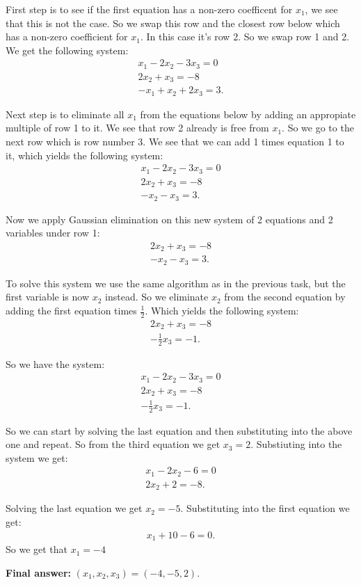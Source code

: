 \documentclass[10pt]{article}
\begin{document}
\begin{solution}[]  \label{sol:}
First step is to see if the first equation has a non-zero coefficent for
\(x_1\), we see that this is not the case. So we swap this row and the closest
row below which has a non-zero coefficient for \(x_1\). In this case it's
row 2. So we swap row 1 and 2. We get the following system:
\begin{align*}
x_1 - 2x_2 - 3x_3 = 0 \\
2x_2 + x_3 = -8 \\
-x_1 + x_2 + 2x_3 = 3
.
\end{align*}

Next step is to eliminate all \(x_1\) from the equations below by adding
an appropiate multiple of row 1 to it. We see that row 2 already is
free from \(x_1\). So we go to the next row which is row number 3. We see
that we can add 1 times equation 1 to it, which yields the following
system:
\begin{align*}
x_1 - 2x_2 - 3x_3 = 0 \\
2x_2 + x_3 = -8 \\
-x_2 - x_3 = 3
.
\end{align*}

Now we apply Gaussian elimination on this new system of 2 equations and
2 variables under row 1:
\begin{align*}
2x_2 + x_3 = -8 \\
-x_2 - x_3 = 3
.
\end{align*}

To solve this system we use the same algorithm as in the previous task, but the
first variable is now \(x_2\) instead. So we eliminate \(x_2\) from the second equation
by adding the first equation times \(\frac{1}{2}\). Which yields the following system:
\begin{align*}
2x_2 + x_3 = -8 \\
- \frac{1}{2} x_3 = -1
.
\end{align*}

So we have the system:
\begin{align*}
x_1 - 2x_2 - 3x_3 = 0 \\
2x_2 + x_3 = -8 \\
-\frac{1}{2}x_3 = -1
.
\end{align*}

So we can start by solving the last equation and then substituting into the above
one and repeat. So from the third equation we get \(x_3 = 2\). Substiuting into the
system we get:
\begin{align*}
x_1 - 2x_2 - 6 = 0 \\
2x_2 + 2 = -8
.
\end{align*}

Solving the last equation we get \(x_2 = -5\). Substituting into the first
equation we get:
\begin{align*}
x_1 + 10 -6 = 0
.
\end{align*}
So we get that \(x_1 = -4\)


\textbf{Final answer:} \((x_1 , x_2 , x_3) = (-4, -5, 2)\).

\end{solution}
\end{document}
